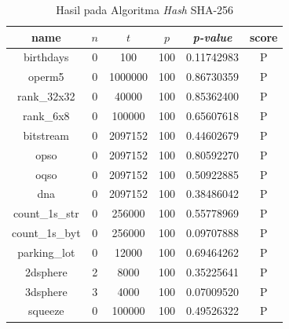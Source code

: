 \documentclass[conference]{IEEEtran}
\newcommand{\en}[1]
    {\foreignlanguage{english}{\textit{#1}}}
\begin{document}
\begin{table}[htbp]
    \caption{Hasil  pada Algoritma \en{Hash} SHA-256}
    \label{tab:analisis:res-sha256}
    \begin{center}
        \begin{tabular}{|c|c|c|c|c|c|}
            \hline
            \textbf{name}  & \textbf{$n$} & \textbf{$t$} & \textbf{$p$} & \textbf{\en{p-value}} & \textbf{score} \\
            \hline
            birthdays      & 0            & 100          & 100          & 0.11742983            & P              \\
            operm5         & 0            & 1000000      & 100          & 0.86730359            & P              \\
            rank\_32x32    & 0            & 40000        & 100          & 0.85362400            & P              \\
            rank\_6x8      & 0            & 100000       & 100          & 0.65607618            & P              \\
            bitstream      & 0            & 2097152      & 100          & 0.44602679            & P              \\
            opso           & 0            & 2097152      & 100          & 0.80592270            & P              \\
            oqso           & 0            & 2097152      & 100          & 0.50922885            & P              \\
            dna            & 0            & 2097152      & 100          & 0.38486042            & P              \\
            count\_1s\_str & 0            & 256000       & 100          & 0.55778969            & P              \\
            count\_1s\_byt & 0            & 256000       & 100          & 0.09707888            & P              \\
            parking\_lot   & 0            & 12000        & 100          & 0.69464262            & P              \\
            2dsphere       & 2            & 8000         & 100          & 0.35225641            & P              \\
            3dsphere       & 3            & 4000         & 100          & 0.07009520            & P              \\
            squeeze        & 0            & 100000       & 100          & 0.49526322            & P              \\

\end{tabular}
\end{center}
\end{table}
\end{document}
